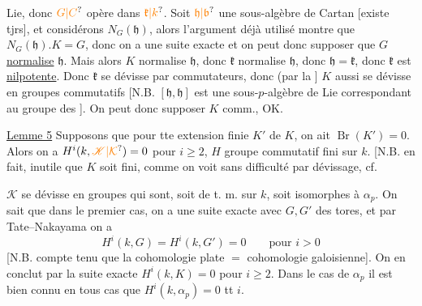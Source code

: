 Lie, donc $\unsure{G|C}$ opère dans $\unsure{\mathfrak{k}|k}$. Soit $\unsure{\mathfrak{h}|\mathfrak{b}}$ une sous-algèbre de Cartan [existe tjrs], et considérons $N_G(\mathfrak{h})$, alors l'argument déjà utilisé montre que $N_G(\mathfrak{h}).K=G$, donc on  a une suite exacte
et on peut donc supposer que $G$ \uline{normalise} $\mathfrak{h}$. Mais alors $K$ normalise $\mathfrak{h}$, donc $\mathfrak{k}$ normalise $\mathfrak{h}$, donc $\mathfrak{h}=\mathfrak{k}$, donc $\mathfrak{k}$ est \uline{nilpotente}. Donc $\mathfrak{k}$ se dévisse  par commutateurs, donc (par la  ] $K$ aussi se dévisse en groupes commutatifs [N.B. $[\mathfrak{h},\mathfrak{h}]$ est une sous-$p$-algèbre de Lie   correspondant au groupe des ]. On peut donc supposer $K$ comm., OK.

\uline{Lemme 5} Supposons que pour tte  extension finie  $K'$ de $K$, on ait $\operatorname{Br}(K')=0$. Alors on a $H^i(k,\unsure{\mathscr{K}|\mathcal{K}})=0$ pour $i\geq2$, $H$ groupe commutatif fini sur $k$. [N.B. en fait, inutile que $K$ soit fini, comme on voit sans difficulté par dévissage, cf. 

$\mathscr{K}$ se dévisse en groupes qui sont, soit de t. m. sur $k$,  soit isomorphes à $\alpha_p$. On sait que dans le premier cas, on a une suite exacte
avec $G,G'$ des tores, et par Tate--Nakayama on a
\[
H^i(k,G)=H^i(k,G')=0\qquad\text{pour }i>0
\]
[N.B. compte tenu que la cohomologie plate $=$ cohomologie galoisienne]. On en conclut par la suite exacte $H^i(k,K)=0$ pour $i\geq2$. Dans le cas de $\alpha_p$ il est bien connu en tous cas que $H^i(k,\alpha_p)=0$ tt $i$.

